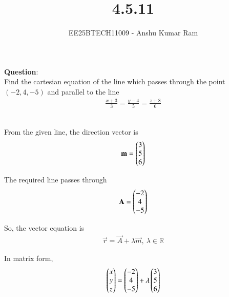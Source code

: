 \documentclass[journal]{IEEEtran}
\begin{document}

\vspace{3cm}

\title{4.5.11}
\author{EE25BTECH11009 - Anshu Kumar Ram }
\maketitle
{\let\newpage\relax\maketitle}

\renewcommand{\thefigure}{\theenumi}
\renewcommand{\thetable}{\theenumi}
\setlength{\intextsep}{10pt} %


\renewcommand{\thetable}{\theenumi}

\textbf{Question}:\\
Find the cartesian equation of the line which passes through the point $(-2,4,-5)$
and parallel to the line 
\begin{align}
\frac{x+3}{3} = \frac{y-4}{5} = \frac{z+8}{6}
\end{align}

\solution \\

From the given line, the direction vector is
\begin{align}
\mathbf{m} = \begin{pmatrix}3 \\ 5 \\ 6\end{pmatrix}
\end{align}

The required line passes through
\begin{align}
\mathbf{A} = \begin{pmatrix}-2 \\ 4 \\ -5\end{pmatrix}
\end{align}

So, the vector equation is
\begin{align}
\vec{r} = \vec{A} + \lambda \vec{m}, \ \lambda \in \mathbb{R}
\end{align}

In matrix form,
\begin{align}
\begin{pmatrix}x \\ y \\ z\end{pmatrix} = \begin{pmatrix}-2 \\ 4 \\ -5\end{pmatrix} + \lambda \begin{pmatrix}3 \\ 5 \\ 6\end{pmatrix}
\end{align}
\end{document}
